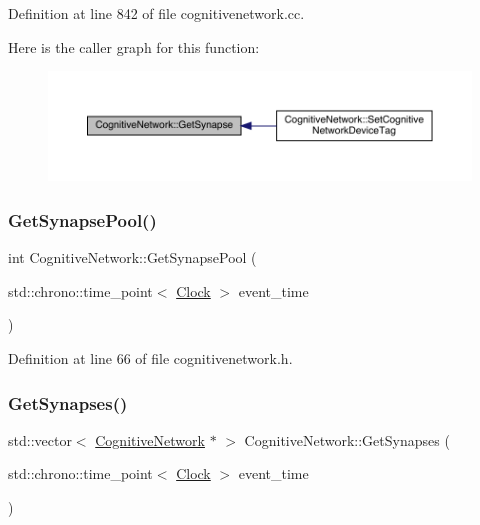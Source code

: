 Definition at line 842 of file cognitivenetwork.\+cc.

Here is the caller graph for this function\+:
\nopagebreak
\begin{figure}[H]
\begin{center}
\leavevmode
\includegraphics[width=350pt]{class_cognitive_network_a1944aaa13667bc267e6ef44892da969d_icgraph}
\end{center}
\end{figure}
\mbox{\label{class_cognitive_network_ae0068b9df823e1b10fed3c73f1cb4702}} 
\subsubsection{\texorpdfstring{Get\+Synapse\+Pool()}{GetSynapsePool()}}
{\footnotesize\ttfamily int Cognitive\+Network\+::\+Get\+Synapse\+Pool (\begin{DoxyParamCaption}\item[{std\+::chrono\+::time\+\_\+point$<$ \hyperlink{universe_8h_a0ef8d951d1ca5ab3cfaf7ab4c7a6fd80}{Clock} $>$}]{event\+\_\+time }\end{DoxyParamCaption})\hspace{0.3cm}{\ttfamily [inline]}}



Definition at line 66 of file cognitivenetwork.\+h.

\mbox{\label{class_cognitive_network_aa3376f2e7aed9639c2b5ba27aa6fb314}} 
\subsubsection{\texorpdfstring{Get\+Synapses()}{GetSynapses()}}
{\footnotesize\ttfamily std\+::vector$<$ \hyperlink{class_cognitive_network}{Cognitive\+Network} $\ast$ $>$ Cognitive\+Network\+::\+Get\+Synapses (\begin{DoxyParamCaption}\item[{std\+::chrono\+::time\+\_\+point$<$ \hyperlink{universe_8h_a0ef8d951d1ca5ab3cfaf7ab4c7a6fd80}{Clock} $>$}]{event\+\_\+time }\end{DoxyParamCaption})}



